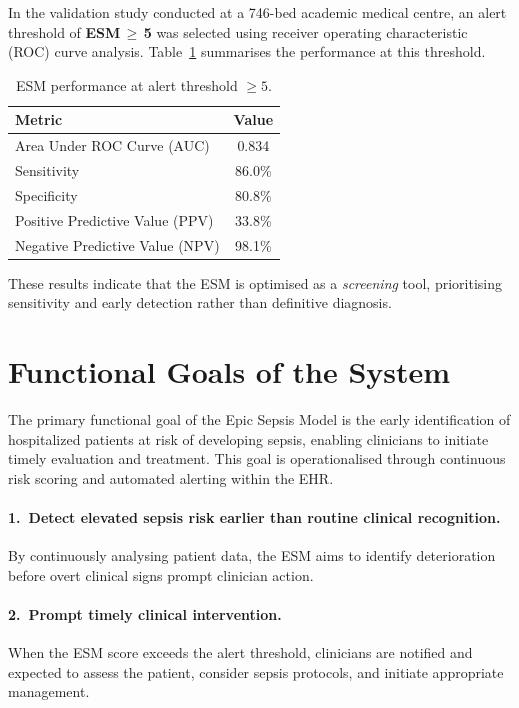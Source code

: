 \documentclass[]{UCD_CS_41820_Report}
\begin{document}
In the validation study conducted at a 746-bed academic medical centre, an alert
threshold of \textbf{ESM\,$\geq$\,5} was selected using receiver operating characteristic
(ROC) curve analysis. Table~\ref{tab:esm_perf} summarises the performance at this
threshold.

\begin{table}[H]
\centering
\renewcommand{\arraystretch}{1.3}
\begin{tabular}{@{}lc@{}}
\toprule
\textbf{Metric} & \textbf{Value} \\
\midrule
Area Under ROC Curve (AUC)      & 0.834 \\
Sensitivity                     & 86.0\% \\
Specificity                     & 80.8\% \\
Positive Predictive Value (PPV) & 33.8\% \\
Negative Predictive Value (NPV) & 98.1\% \\
\bottomrule
\end{tabular}
\caption{ESM performance at alert threshold $\geq 5$.}
\label{tab:esm_perf}
\end{table}

These results indicate that the ESM is optimised as a \emph{screening} tool,
prioritising sensitivity and early detection rather than definitive diagnosis.
\setlength{\parskip}{0pt}
\section{Functional Goals of the System}

The primary functional goal of the Epic Sepsis Model is the early identification of
hospitalized patients at risk of developing sepsis, enabling clinicians to initiate
timely evaluation and treatment. This goal is operationalised through continuous risk
scoring and automated alerting within the EHR.
\setlength{\parskip}{0pt}
\paragraph{1.\ Detect elevated sepsis risk earlier than routine clinical recognition.}
By continuously analysing patient data, the ESM aims to identify deterioration before
overt clinical signs prompt clinician action.

\paragraph{2.\ Prompt timely clinical intervention.}
When the ESM score exceeds the alert threshold, clinicians are notified and expected
to assess the patient, consider sepsis protocols, and initiate appropriate management.
\end{document}
